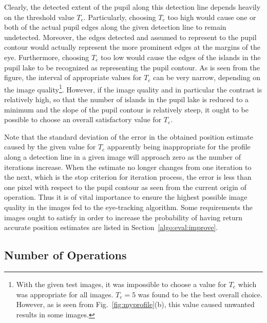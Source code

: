 Clearly, the detected extent of the pupil along this detection line
depends heavily on the threshold value $T_{e}$.  Particularly,
choosing $T_{e}$ too high would cause one or both of the actual pupil
edges along the given detection line to remain undetected.  Moreover,
the edges detected and assumed to represent to the pupil contour would
actually represent the more prominent edges at the margins of the eye.
Furthermore, choosing $T_{e}$ too low would cause the edges of the
islands in the pupil lake to be recognized as representing the pupil
contour.  As is seen from the figure, the interval of appropriate
values for $T_{e}$ can be very narrow, depending on the image
quality\footnote{\label{pg:TEproblems}With the given test images, it
  was impossible to choose a value for $T_{e}$ which was appropriate
  for all images.  $T_{e}=5$ was found to be the best overall choice.
  However, as is seen from Fig.~\ref{fig:myprofile}(b), this value
  caused unwanted results in some images.}.  However, if the image
quality and in particular the contrast is relatively high, so that the
number of islands in the pupil lake is reduced to a minimum and the
slope of the pupil contour is relatively steep, it ought to be
possible to choose an overall satisfactory value for $T_{e}$.

Note that the standard deviation of the error in the obtained position
estimate caused by the given value for $T_{e}$ apparently being
inappropriate for the profile along a detection line in a given image
will approach zero as the number of iterations increase.  When the
estimate no longer changes from one iteration to the next, which is
the stop criterion for iteration process, the error is less than one
pixel with respect to the pupil contour as seen from the current
origin of operation.  Thus it is of vital importance to ensure the
highest possible image quality in the images fed to the {\octopus}
eye-tracking algorithm.  Some requirements the images ought to satisfy
in order to increase the probability of having {\octopus} return
accurate position estimates are listed in
Section~\ref{algo:eval:improve}.

\subsection{Number of Operations}
\label{algo:pos:O}

